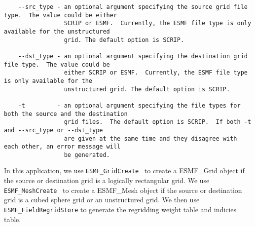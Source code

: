 \begin{verbatim}
    --src_type - an optional argument specifying the source grid file type.  The value could be either
                 SCRIP or ESMF.  Currently, the ESMF file type is only available for the unstructured 
                 grid. The default option is SCRIP.

    --dst_type - an optional argument specifying the destination grid file type.  The value could be 
                 either SCRIP or ESMF.  Currently, the ESMF file type is only available for the
                 unstructured grid. The default option is SCRIP.

    -t         - an optional argument specifying the file types for both the source and the destination
                 grid files.  The default option is SCRIP.  If both -t and --src_type or --dst_type
                 are given at the same time and they disagree with each other, an error message will
                 be generated.
\end{verbatim}

In this application, we use {\tt ESMF\_GridCreate}~\cite{example:2DLogRecFromScrip} to create a 
ESMF_Grid object if the source or destination grid is a logically rectangular grid.  We use 
{\tt ESMF\_MeshCreate}~\cite{sec:example:UnstructFromFile} to create a ESMF_Mesh object if the 
source or destination grid is a cubed sphere grid or an unstructured grid.  We then use
{\tt ESMF_FieldRegridStore} to generate the regridding weight table and indicies table.   
